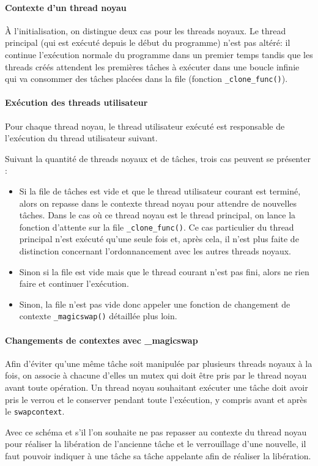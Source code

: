 \paragraph{Contexte d'un thread noyau} À l'initialisation, on distingue deux cas pour les threads noyaux. Le thread principal (qui est exécuté depuis le début du programme) n'est pas altéré: il continue l'exécution normale du programme dans un premier temps tandis que les threads créés attendent les premières tâches à exécuter dans une boucle infinie qui va consommer des tâches placées dans la file (fonction \verb!_clone_func()!).

\paragraph{Exécution des threads utilisateur} Pour chaque thread noyau, le thread utilisateur exécuté est responsable de l'exécution du thread utilisateur suivant. 

Suivant la quantité de threads noyaux et de tâches, trois cas peuvent se présenter :
\begin{itemize}
\item Si la file de tâches est vide et que le thread utilisateur courant est terminé, alors on repasse dans le contexte thread noyau pour attendre de nouvelles tâches. Dans le cas où ce thread noyau est le thread principal, on lance la fonction d'attente sur la file \verb!_clone_func()!. Ce cas particulier du thread principal n'est exécuté qu'une seule fois et, après cela, il n'est plus faite de distinction concernant l'ordonnancement avec les autres threads noyaux.
\item Sinon si la file est vide mais que le thread courant n'est pas fini, alors ne rien faire et continuer l'exécution.
\item Sinon, la file n'est pas vide donc appeler une fonction de changement de contexte \verb!_magicswap()! détaillée plus loin.
\end{itemize}

\paragraph{Changements de contextes avec \_magicswap} Afin d'éviter qu'une même tâche soit manipulée par plusieurs threads noyaux à la fois, on associe à chacune d'elles un mutex qui doit être pris par le thread noyau avant toute opération. Un thread noyau souhaitant exécuter une tâche doit avoir pris le verrou et le conserver pendant toute l'exécution, y compris avant et après le \verb!swapcontext!.

Avec ce schéma et s'il l'on souhaite ne pas repasser au contexte du thread noyau pour réaliser la libération de l'ancienne tâche et le verrouillage d'une nouvelle, il faut pouvoir indiquer à une tâche sa tâche appelante afin de réaliser la libération.
